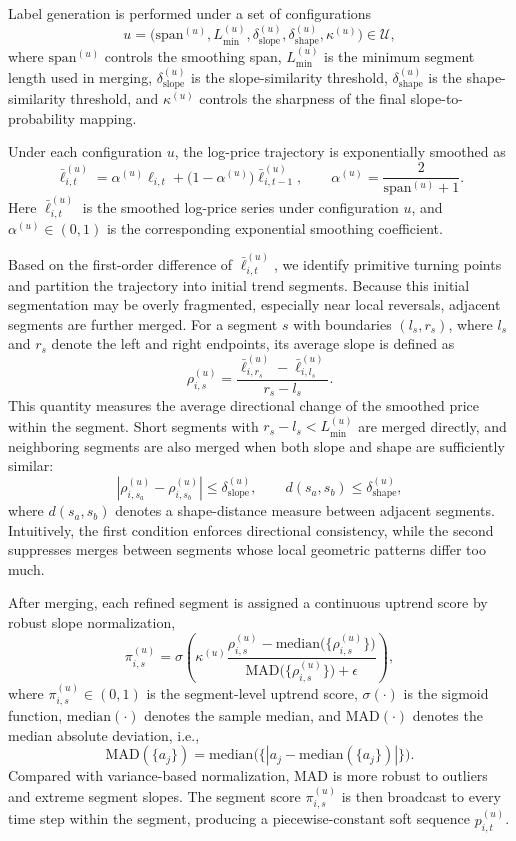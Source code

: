 \documentclass[letterpaper]{article} %
\begin{document}
Label generation is performed under a set of configurations
\[
u=\bigl(\mathrm{span}^{(u)}, L_{\min}^{(u)}, \delta_{\mathrm{slope}}^{(u)}, \delta_{\mathrm{shape}}^{(u)}, \kappa^{(u)}\bigr)\in\mathcal{U},
\]
where \(\mathrm{span}^{(u)}\) controls the smoothing span, \(L_{\min}^{(u)}\) is the minimum segment length used in merging, \(\delta_{\mathrm{slope}}^{(u)}\) is the slope-similarity threshold, \(\delta_{\mathrm{shape}}^{(u)}\) is the shape-similarity threshold, and \(\kappa^{(u)}\) controls the sharpness of the final slope-to-probability mapping.

Under each configuration \(u\), the log-price trajectory is exponentially smoothed as
\[
\bar{\ell}^{(u)}_{i,t}
=
\alpha^{(u)}\ell_{i,t}
+
\bigl(1-\alpha^{(u)}\bigr)\bar{\ell}^{(u)}_{i,t-1},
\qquad
\alpha^{(u)}=\frac{2}{\mathrm{span}^{(u)}+1}.
\]
Here \(\bar{\ell}^{(u)}_{i,t}\) is the smoothed log-price series under configuration \(u\), and \(\alpha^{(u)}\in(0,1)\) is the corresponding exponential smoothing coefficient.

Based on the first-order difference of \(\bar{\ell}^{(u)}_{i,t}\), we identify primitive turning points and partition the trajectory into initial trend segments. Because this initial segmentation may be overly fragmented, especially near local reversals, adjacent segments are further merged. For a segment \(s\) with boundaries \((l_s,r_s)\), where \(l_s\) and \(r_s\) denote the left and right endpoints, its average slope is defined as
\[
\rho^{(u)}_{i,s}
=
\frac{\bar{\ell}^{(u)}_{i,r_s}-\bar{\ell}^{(u)}_{i,l_s}}{r_s-l_s}.
\]
This quantity measures the average directional change of the smoothed price within the segment. Short segments with \(r_s-l_s<L_{\min}^{(u)}\) are merged directly, and neighboring segments are also merged when both slope and shape are sufficiently similar:
\[
\left|
\rho^{(u)}_{i,s_a}-\rho^{(u)}_{i,s_b}
\right|
\le
\delta_{\mathrm{slope}}^{(u)},
\qquad
d(s_a,s_b)\le \delta_{\mathrm{shape}}^{(u)},
\]
where \(d(s_a,s_b)\) denotes a shape-distance measure between adjacent segments. Intuitively, the first condition enforces directional consistency, while the second suppresses merges between segments whose local geometric patterns differ too much.

After merging, each refined segment is assigned a continuous uptrend score by robust slope normalization,
\[
\pi^{(u)}_{i,s}
=
\sigma\!\left(
\kappa^{(u)}
\frac{
\rho^{(u)}_{i,s}-\mathrm{median}\!\bigl(\{\rho^{(u)}_{i,s}\}\bigr)
}{
\mathrm{MAD}\!\bigl(\{\rho^{(u)}_{i,s}\}\bigr)+\epsilon
}
\right),
\]
where \(\pi^{(u)}_{i,s}\in(0,1)\) is the segment-level uptrend score, \(\sigma(\cdot)\) is the sigmoid function, \(\mathrm{median}(\cdot)\) denotes the sample median, and \(\mathrm{MAD}(\cdot)\) denotes the median absolute deviation, i.e.,
\[
\mathrm{MAD}(\{a_j\})=\mathrm{median}\bigl(\{|a_j-\mathrm{median}(\{a_j\})|\}\bigr).
\]
Compared with variance-based normalization, MAD is more robust to outliers and extreme segment slopes. The segment score \(\pi^{(u)}_{i,s}\) is then broadcast to every time step within the segment, producing a piecewise-constant soft sequence \(p^{(u)}_{i,t}\).
\end{document}
